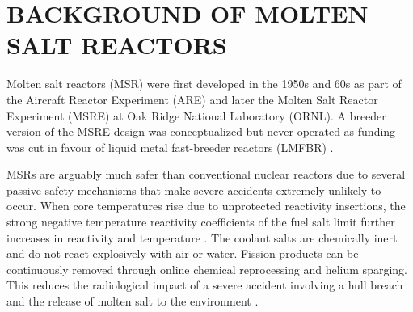 \documentclass{anstrans}
\begin{document}
\section{BACKGROUND OF MOLTEN SALT REACTORS}


Molten salt reactors (MSR) were first developed in the 1950s and 60s as part of the Aircraft Reactor Experiment (ARE) and later the Molten Salt Reactor Experiment (MSRE) at Oak Ridge National Laboratory (ORNL). A breeder version of the MSRE design was conceptualized but never operated as funding was cut in favour of liquid metal fast-breeder reactors (LMFBR) \cite{macpherson_molten_1985}.


MSRs are arguably much safer than conventional nuclear reactors due to several passive safety mechanisms that make severe accidents extremely unlikely to occur. When core temperatures rise due to unprotected reactivity insertions, the strong negative temperature reactivity coefficients of the fuel salt limit further increases in reactivity and temperature \cite{elsheikh_safety_2013}. The coolant salts are chemically inert and do not react explosively with air or water. Fission products can be continuously removed through online chemical reprocessing and helium sparging. This reduces the radiological impact of a severe accident involving a hull breach and the release of molten salt to the environment \cite{elsheikh_safety_2013}.
\end{document}
